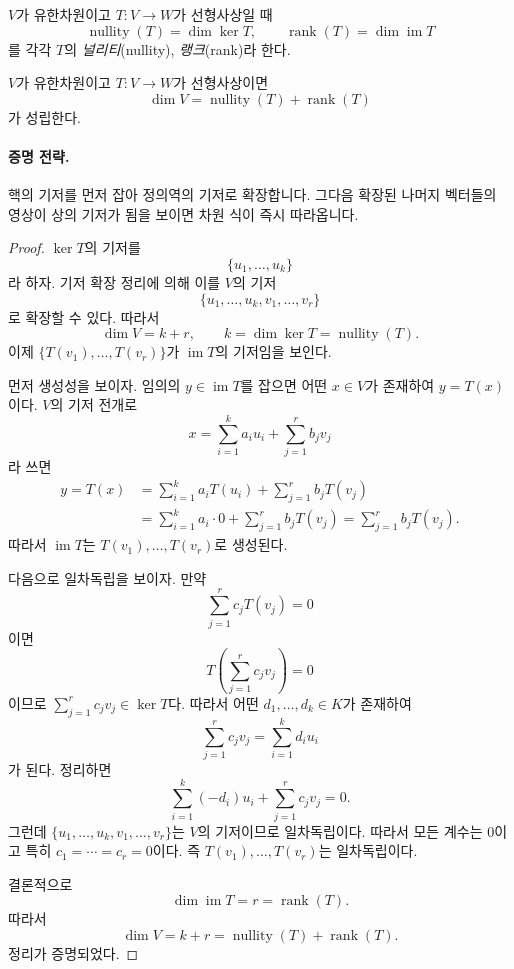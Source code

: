 
\begin{definition}
$V$가 유한차원이고 $T:V\to W$가 선형사상일 때
\[
\operatorname{nullity}(T)=\dim\ker T,\qquad
\operatorname{rank}(T)=\dim\operatorname{im}T
\]
를 각각 $T$의 \emph{널리티}(nullity), \emph{랭크}(rank)라 한다.
\end{definition}

\begin{theorem}
$V$가 유한차원이고 $T:V\to W$가 선형사상이면
\[
\dim V=\operatorname{nullity}(T)+\operatorname{rank}(T)
\]
가 성립한다.
\end{theorem}

\paragraph{증명 전략.}
핵의 기저를 먼저 잡아 정의역의 기저로 확장합니다. 그다음 확장된 나머지 벡터들의 영상이 상의 기저가 됨을 보이면 차원 식이 즉시 따라옵니다.

\begin{proof}
$\ker T$의 기저를
\[
\{u_1,\dots,u_k\}
\]
라 하자. 기저 확장 정리에 의해 이를 $V$의 기저
\[
\{u_1,\dots,u_k,v_1,\dots,v_r\}
\]
로 확장할 수 있다. 따라서
\[
\dim V=k+r,\qquad k=\dim\ker T=\operatorname{nullity}(T).
\]
이제 $\{T(v_1),\dots,T(v_r)\}$가 $\operatorname{im}T$의 기저임을 보인다.

먼저 생성성을 보이자. 임의의 $y\in\operatorname{im}T$를 잡으면 어떤 $x\in V$가 존재하여 $y=T(x)$이다. $V$의 기저 전개로
\[
x=\sum_{i=1}^k a_i u_i+\sum_{j=1}^r b_j v_j
\]
라 쓰면
\[
\begin{aligned}
y=T(x)
&=\sum_{i=1}^k a_iT(u_i)+\sum_{j=1}^r b_jT(v_j)\\
&=\sum_{i=1}^k a_i\cdot 0+\sum_{j=1}^r b_jT(v_j)
=\sum_{j=1}^r b_jT(v_j).
\end{aligned}
\]
따라서 $\operatorname{im}T$는 $T(v_1),\dots,T(v_r)$로 생성된다.

다음으로 일차독립을 보이자. 만약
\[
\sum_{j=1}^r c_jT(v_j)=0
\]
이면
\[
T\!\left(\sum_{j=1}^r c_jv_j\right)=0
\]
이므로 $\sum_{j=1}^r c_jv_j\in\ker T$다. 따라서 어떤 $d_1,\dots,d_k\in K$가 존재하여
\[
\sum_{j=1}^r c_jv_j=\sum_{i=1}^k d_i u_i
\]
가 된다. 정리하면
\[
\sum_{i=1}^k (-d_i)u_i+\sum_{j=1}^r c_jv_j=0.
\]
그런데 $\{u_1,\dots,u_k,v_1,\dots,v_r\}$는 $V$의 기저이므로 일차독립이다. 따라서 모든 계수는 $0$이고 특히 $c_1=\cdots=c_r=0$이다. 즉 $T(v_1),\dots,T(v_r)$는 일차독립이다.

결론적으로
\[
\dim\operatorname{im}T=r=\operatorname{rank}(T).
\]
따라서
\[
\dim V=k+r=\operatorname{nullity}(T)+\operatorname{rank}(T).
\]
정리가 증명되었다.
\end{proof}

